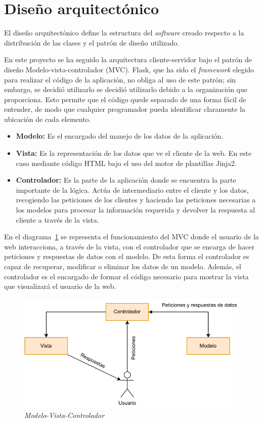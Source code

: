\section{Diseño arquitectónico}
El diseño arquitectónico define la estructura del \textit{software} creado respecto a la distribución de las clases y el patrón de diseño utilizado.

En este proyecto se ha seguido la arquitectura cliente-servidor bajo el patrón de diseño Modelo-vista-controlador (MVC).
Flask, que ha sido el \textit{framework} elegido para realizar el código de la aplicación, no obliga al uso de este patrón; sin embargo, se decidió utilizarlo se decidió utilizarlo debido a la organización que proporciona. 
Esto permite que el código quede separado de una forma fácil de entender, de modo que cualquier programador pueda identificar claramente la ubicación de cada elemento.

\begin{itemize}
\item \textbf{Modelo:}
Es el encargado del manejo de los datos de la aplicación.

\item \textbf{Vista:} 
Es la representación de los datos que ve el cliente de la web.
En este caso mediante código HTML bajo el uso del motor de plantillas Jinja2.

\item \textbf{Controlador:} 
Es la parte de la aplicación donde se encuentra la parte importante de la lógica.
Actúa de intermediario entre el cliente y los datos, recogiendo las peticiones de los clientes y haciendo las peticiones necesarias a los modelos para procesar la información requerida y devolver la respuesta al cliente a través de la vista.
\end{itemize}

En el diagrama~\ref{MVC} se representa el funcionamiento del MVC donde el usuario de la web interacciona, a través de la vista, con el controlador que se encarga de hacer peticiones y respuestas de datos con el modelo.
De esta forma el controlador es capaz de recuperar, modificar o eliminar los datos de un modelo.
Además, el controlador es el encargado de formar el código necesario para mostrar la vista que visualizará el usuario de la web.


\begin{figure}
	\centering
	\includegraphics[width=\textwidth]{../img/Anexos/MVC.pdf}
	\caption{\textit{Modelo-Vista-Controlador}}\label{MVC}
\end{figure}






